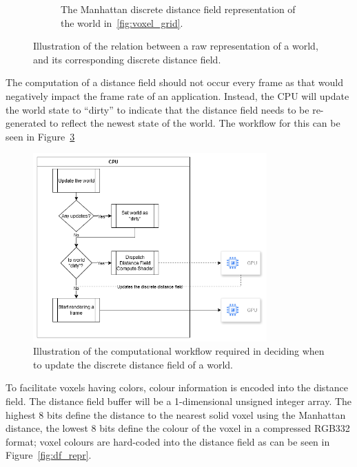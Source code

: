 \begin{figure}[htbp]
\begin{subfigure}{0.49\textwidth}
        \caption{The Manhattan discrete distance field representation of the world in~\ref{fig:voxel_grid}.}
        \label{fig:voxel_grid_df}
    \end{subfigure}
    \caption{Illustration of the relation between a raw representation of a world, and its corresponding discrete
        distance field.}
    \label{fig:voxel_grid_df_rel}
\end{figure}

The computation of a distance field should not occur every frame as that would negatively impact the frame rate of an
application. Instead, the CPU will update the world state to ``dirty'' to indicate that the distance field needs to be
re-generated to reflect the newest state of the world. The workflow for this can be seen in Figure~\ref{fig:df_update_proc}

\begin{figure}[htbp]
    \centering
    \includegraphics[width=0.8\textwidth]{figures/df_update_proc.drawio.png}
    \caption{Illustration of the computational workflow required in deciding when to update the discrete distance field
        of a world.}
    \label{fig:df_update_proc}
\end{figure}

To facilitate voxels having colors, colour information is encoded into the distance field. The distance field buffer
will be a 1-dimensional unsigned integer array. The highest 8 bits define the distance to the nearest solid voxel using
the Manhattan distance, the lowest 8 bits define the colour of the voxel in a compressed RGB332 format; voxel colours
are hard-coded into the distance field as can be seen in Figure~\ref{fig:df_repr}.

